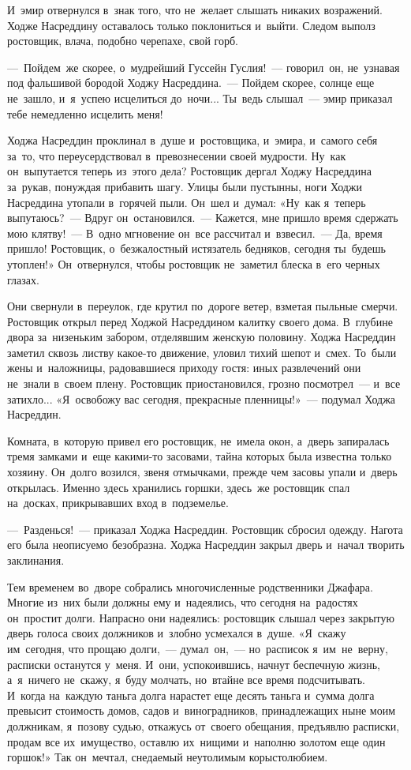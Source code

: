 \documentclass[12pt,a4paper]{book}
\begin{document}
И~эмир отвернулся в~знак того, что не~желает слышать никаких возражений. Ходже Насреддину оставалось только поклониться и~выйти. Следом выполз ростовщик, влача, подобно черепахе, свой горб.

—~Пойдем~же скорее, о~мудрейший Гуссейн Гуслия!~— говорил~он, не~узнавая под фальшивой бородой Ходжу Насреддина.~— Пойдем скорее, солнце еще не~зашло, и~я~успею исцелиться до~ночи... Ты~ведь слышал~— эмир приказал тебе немедленно исцелить меня!

Ходжа Насреддин проклинал в~душе и~ростовщика, и~эмира, и~самого себя за~то, что переусердствовал в~превознесении своей мудрости. Ну~как он~выпутается теперь из~этого дела? Ростовщик дергал Ходжу Насреддина за~рукав, понуждая прибавить шагу. Улицы были пустынны, ноги Ходжи Насреддина утопали в~горячей пыли. Он~шел и~думал: «Ну~как я~теперь выпутаюсь?~— Вдруг он~остановился.~— Кажется, мне пришло время сдержать мою клятву!~— В~одно мгновение он~все рассчитал и~взвесил.~— Да, время пришло! Ростовщик, о~безжалостный истязатель бедняков, сегодня ты~будешь утоплен!» Он~отвернулся, чтобы ростовщик не~заметил блеска в~его черных глазах.

Они свернули в~переулок, где крутил по~дороге ветер, взметая пыльные смерчи. Ростовщик открыл перед Ходжой Насреддином калитку своего дома. В~глубине двора за~низеньким забором, отделявшим женскую половину. Ходжа Насреддин заметил сквозь листву какое-то движение, уловил тихий шепот и~смех. То~были жены и~наложницы, радовавшиеся приходу гостя: иных развлечений они не~знали в~своем плену. Ростовщик приостановился, грозно посмотрел~— и~все затихло... «Я~освобожу вас сегодня, прекрасные пленницы!»~— подумал Ходжа Насреддин.

Комната, в~которую привел его ростовщик, не~имела окон, а~дверь запиралась тремя замками и~еще какими-то засовами, тайна которых была известна только хозяину. Он~долго возился, звеня отмычками, прежде чем засовы упали и~дверь открылась. Именно здесь хранились горшки, здесь~же ростовщик спал на~досках, прикрывавших вход в~подземелье.

—~Разденься!~— приказал Ходжа Насреддин. Ростовщик сбросил одежду. Нагота его была неописуемо безобразна. Ходжа Насреддин закрыл дверь и~начал творить заклинания.

Тем временем во~дворе собрались многочисленные родственники Джафара. Многие из~них были должны ему и~надеялись, что сегодня на~радостях он~простит долги. Напрасно они надеялись: ростовщик слышал через закрытую дверь голоса своих должников и~злобно усмехался в~душе. «Я~скажу им~сегодня, что прощаю долги,~— думал~он,~— но~расписок я~им~не~верну, расписки останутся у~меня. И~они, успокоившись, начнут беспечную жизнь, а~я~ничего не~скажу, я~буду молчать, но~втайне все время подсчитывать. И~когда на~каждую таньга долга нарастет еще десять таньга и~сумма долга превысит стоимость домов, садов и~виноградников, принадлежащих ныне моим должникам, я~позову судью, откажусь от~своего обещания, предъявлю расписки, продам все их~имущество, оставлю их~нищими и~наполню золотом еще один горшок!» Так он~мечтал, снедаемый неутолимым корыстолюбием.
\end{document}
